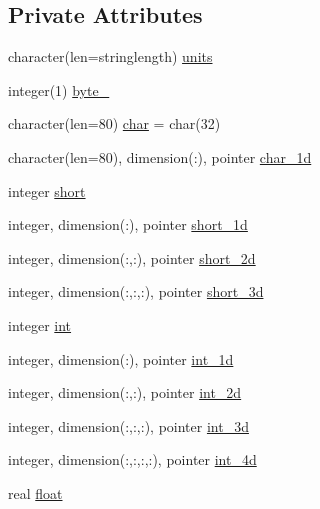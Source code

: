 \subsection*{Private Attributes}
\begin{DoxyCompactItemize}
\item 
character(len=stringlength) \mbox{\hyperlink{structmodulewoaformat_1_1t__value_a44d6224663ece6db52ef2ac8ec65edb4}{units}}
\item 
integer(1) \mbox{\hyperlink{structmodulewoaformat_1_1t__value_ae809c64acab9bc0ccde4e90e02c57daa}{byte\+\_\+}}
\item 
character(len=80) \mbox{\hyperlink{structmodulewoaformat_1_1t__value_a2c23e05e55c7fe1688d43dc90854eae2}{char}} = char(32)
\item 
character(len=80), dimension(\+:), pointer \mbox{\hyperlink{structmodulewoaformat_1_1t__value_a417b9c502fd567d2e5d3bc7d0315e7be}{char\+\_\+1d}}
\item 
integer \mbox{\hyperlink{structmodulewoaformat_1_1t__value_a996babb554e533321fec2fc1ca2fbf33}{short}}
\item 
integer, dimension(\+:), pointer \mbox{\hyperlink{structmodulewoaformat_1_1t__value_acc37a6d3212d9f3e5ae165e8ca68c657}{short\+\_\+1d}}
\item 
integer, dimension(\+:,\+:), pointer \mbox{\hyperlink{structmodulewoaformat_1_1t__value_a84e561da74bea330434368d247694eaf}{short\+\_\+2d}}
\item 
integer, dimension(\+:,\+:,\+:), pointer \mbox{\hyperlink{structmodulewoaformat_1_1t__value_a895c2506f8fe1f7ff7a476da6744cfb8}{short\+\_\+3d}}
\item 
integer \mbox{\hyperlink{structmodulewoaformat_1_1t__value_ae0367a995ac0150f2aed61e8992274ae}{int}}
\item 
integer, dimension(\+:), pointer \mbox{\hyperlink{structmodulewoaformat_1_1t__value_afb09db682b7ad5ee5d359fe918acb60c}{int\+\_\+1d}}
\item 
integer, dimension(\+:,\+:), pointer \mbox{\hyperlink{structmodulewoaformat_1_1t__value_a5df96d5da28e1f83cdbd44134d70667a}{int\+\_\+2d}}
\item 
integer, dimension(\+:,\+:,\+:), pointer \mbox{\hyperlink{structmodulewoaformat_1_1t__value_ac659448e828f2096e1b4b3d04f40c976}{int\+\_\+3d}}
\item 
integer, dimension(\+:,\+:,\+:,\+:), pointer \mbox{\hyperlink{structmodulewoaformat_1_1t__value_ac4c044c6583f16607ac140787c5e78d7}{int\+\_\+4d}}
\item 
real \mbox{\hyperlink{structmodulewoaformat_1_1t__value_a71dca4104e5908e78801f5a1f96a9ba1}{float}}

\end{DoxyCompactItemize}

